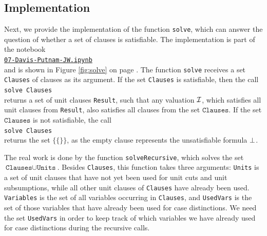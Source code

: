 \subsection{Implementation}
Next, we provide the implementation of the function \texttt{solve}, which can answer the question of whether a
set of clauses is satisfiable.  The implementation is part of the notebook
\\[0.2cm]
\hspace*{1.3cm}
\href{https://github.com/karlstroetmann/Logic/blob/master/F-Sharp/Chapter-4/07-Davis-Putnam-JW.ipynb}{\texttt{07-Davis-Putnam-JW.ipynb}}
\\[0.2cm]
and is shown in Figure \ref{fig:solve} on page \pageref{fig:solve}.
The function \texttt{solve} receives a set \texttt{Clauses} of clauses as its argument.
If the set \texttt{Clauses} is satisfiable, then the call
\\[0.2cm]
\hspace*{1.3cm}
\texttt{solve Clauses} 
\\[0.2cm]
returns a set of unit clauses \texttt{Result}, such
that any valuation $\mathcal{I}$, which satisfies all unit clauses from \texttt{Result}, also satisfies all clauses from
the set $\texttt{Clauses}$. If the set $\texttt{Clauses}$ is not satisfiable, the call
\\[0.2cm]
\hspace*{1.3cm}
\texttt{solve Clauses} 
\\[0.2cm]
returns the set $\bigl\{ \{\} \bigr\}$, as the empty clause represents the unsatisfiable formula $\bot$.

The real work is done by the function \texttt{solveRecursive}, which solves the set
$\texttt{Clauses} \cup \texttt{Units}$.  Besides \texttt{Clauses}, this function takes three arguments:
\texttt{Units} is a set of unit clauses that have not yet been used for unit cuts and unit subsumptions, while all
other unit clauses of \texttt{Clauses} have already been used.  \texttt{Variables} is the set of all variables
occurring in \texttt{Clauses}, and \texttt{UsedVars} is the set of those variables that have already been used for
case distinctions.  We need the set \texttt{UsedVars} in order to keep track of which variables we have already
used for case distinctions during the recursive calls.

